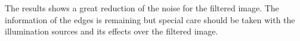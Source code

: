 \documentclass[a4paper, 10pt, conference] {article}
\begin{document}

The results shows a great reduction of the noise for the filtered image. The information of the edges is remaining but special care should be taken with the illumination sources and its effects over the filtered image.





%
%
% 
\end{document}
